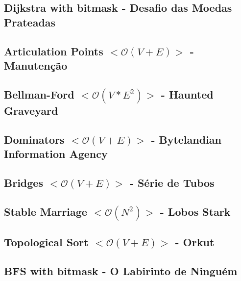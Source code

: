 \documentclass[11pt, a4paper, twoside, notitlepage]{article}
\begin{document}
\subsection{Dijkstra with bitmask - Desafio das Moedas Prateadas}



\subsection{Articulation Points $<\mathcal{O}(V+E)>$ - Manutenção}



\subsection{Bellman-Ford $<\mathcal{O}(V*E^{2})>$ - Haunted Graveyard}



\subsection{Dominators $<\mathcal{O}(V+E)>$ - Bytelandian Information Agency}



\subsection{Bridges $<\mathcal{O}(V+E)>$ - Série de Tubos}



\subsection{Stable Marriage $<\mathcal{O}(N^{2})>$ - Lobos Stark}



\subsection{Topological Sort $<\mathcal{O}(V+E)>$ - Orkut}



\subsection{BFS with bitmask - O Labirinto de Ninguém}
\end{document}

